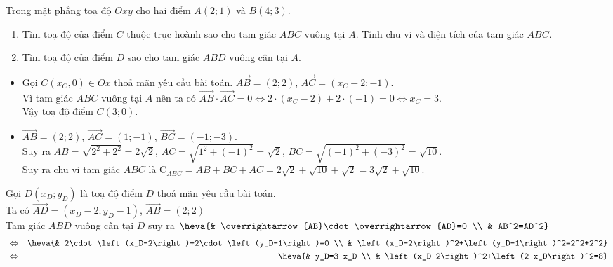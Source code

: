 \begin{bt}%
	Trong mặt phẳng toạ độ $Oxy$ cho hai điểm $A(2;1)$ và $B(4;3)$.
	\begin{enumerate}
		\item Tìm toạ độ của điểm $C$ thuộc trục hoành sao cho tam giác $ABC$ vuông tại $A$. Tính chu vi và diện tích của tam giác $ABC$.
		\item Tìm toạ độ của điểm $D$ sao cho tam giác $ABD$ vuông cân tại $A$.
	\end{enumerate}
	\loigiai
	{
		\begin{listEX}
			\item 
			\begin{itemize}
				\item Gọi $C\left(x_C,0\right)\in Ox$ thoả mãn yêu cầu bài toán.
				$\overrightarrow{AB}=\left(2;2\right)$, $\overrightarrow{AC}=\left(x_C-2;-1\right)$.\\
				Vì tam giác $ABC$ vuông tại $A$ nên ta có $\overrightarrow{AB}\cdot\overrightarrow{AC}=0\Leftrightarrow 2\cdot\left(x_C-2\right)+2\cdot(-1)=0\Leftrightarrow x_C=3$.\\
				Vậy toạ độ điểm $C\left(3;0\right)$.
				\item $\overrightarrow{AB}=\left(2;2\right)$, $\overrightarrow{AC}=\left(1;-1\right)$, $\overrightarrow{BC}=\left(-1;-3\right)$.\\ 
				Suy ra $AB=\sqrt{2^2+2^2}=2\sqrt{2}$, $AC=\sqrt{1^2+(-1)^2}=\sqrt{2}$, $BC=\sqrt{(-1)^2+(-3)^2}=\sqrt{10}$.\\
				Suy ra chu vi tam giác $ABC$ là $\mathrm{C}_{ABC}=AB+BC+AC=2\sqrt{2}+\sqrt{10}+\sqrt{2}=3\sqrt{2}+\sqrt{10}$.
			\end{itemize}
			\item Gọi $D\left(x_D;y_D\right)$ là toạ độ điểm $D$ thoả mãn yêu cầu bài toán.\\
			Ta có $\overrightarrow{AD}=\left(x_D-2;y_D-1\right)$, $\overrightarrow{AB}=\left(2;2\right)$\\
			Tam giác $ABD$ vuông cân tại $D$ suy ra $\heva{& \overrightarrow{AB}\cdot\overrightarrow{AD}=0 \\ & AB^2=AD^2}$ \allowdisplaybreaks
			\begin{eqnarray*}
				&\Leftrightarrow&\heva{& 2\cdot\left(x_D-2\right)+2\cdot\left(y_D-1\right)=0 \\ & \left(x_D-2\right)^2+\left(y_D-1\right)^2=2^2+2^2}\\
				&\Leftrightarrow&\heva{& y_D=3-x_D \\ & \left(x_D-2\right)^2+\left(2-x_D\right)^2=8}\\

\end{eqnarray*}
\end{listEX}}
\end{bt}
